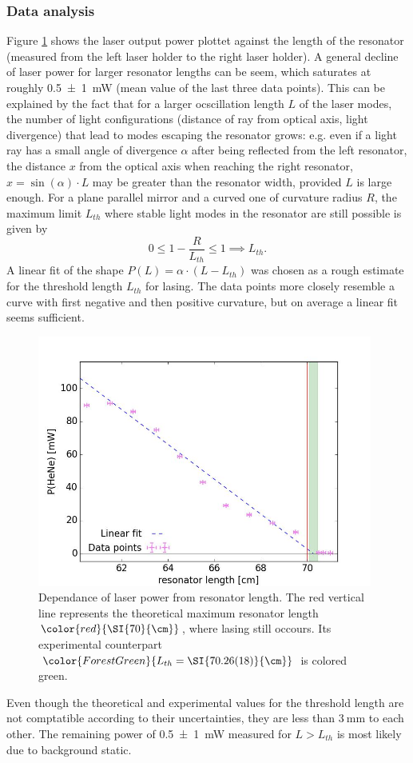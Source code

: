 \documentclass[../main.tex]{subfiles}
\begin{document}
\subsubsection*{Data analysis}
    Figure \ref{fig:4-Laserleistung-Resonatorlaenge} shows the laser output power plottet against the length of the resonator (measured from the left laser holder to the right laser holder). A general decline of laser power for larger resonator lengths can be seem, which saturates at roughly \SI{0.5(10)}{\mW} (mean value of the last three data points). This can be explained by the fact that for a larger ocscillation length $L$ of the laser modes, the number of light configurations (distance of ray from optical axis, light divergence) that lead to modes escaping the resonator grows: e.g. even if a light ray has a small angle of divergence $\alpha$ after being reflected from the left resonator, the distance $x$ from the optical axis when reaching the right resonator, $x = \sin(\alpha)\cdot L$ may be greater than the resonator width, provided $L$ is large enough. For a plane parallel mirror and a curved one of curvature radius $R$, the maximum limit $L_{th}$ where stable light modes in the resonator are still possible is given by \cite[p.15]{doc:HeNeStudentManual} 
    \[
        0 \le 1 - \frac{R}{L_{th}} \le 1 \implies L_{th}.    
    \]
    A linear fit of the shape $P(L) = \alpha\cdot (L - L_{th})$ was chosen as a rough estimate for the threshold length $L_{th}$ for lasing. The data points more closely resemble a curve with first negative and then positive curvature, but on average a linear fit seems sufficient.

    \begin{figure}[H]
        \centering
        \includegraphics[width = 11cm]{Bilddateien/4/4-Laserleistung-Resonatorlaenge.jpg}
        \caption{Dependance of laser power from resonator length. The red vertical line represents the theoretical maximum resonator length $\color{red}{\SI{70}{\cm}}$, where lasing still occours. Its experimental counterpart $\color{ForestGreen}{L_{th} = \SI{70.26(18)}{\cm}}$  is colored green.}
        \label{fig:4-Laserleistung-Resonatorlaenge}
    \end{figure}

    \noindent Even though the theoretical and experimental values for the threshold length are not comptatible according to their uncertainties, they are less than $\SI{3}{\mm}$ to each other. The remaining power of \SI{0.5(10)}{\mW} measured for $L > L_{th}$ is most likely due to background static.
\end{document}
